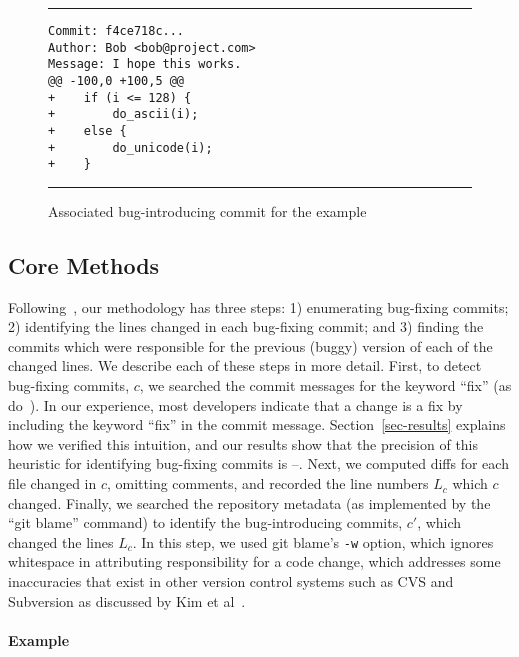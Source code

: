 \begin{figure}[t!bh]
\centering
\rule{0.92\columnwidth}{0.5pt}
\begin{minipage}[h]{0.92\columnwidth}
\begin{lstlisting}[basicstyle=\small]
Commit: f4ce718c...
Author: Bob <bob@project.com>
Message: I hope this works.
@@ -100,0 +100,5 @@
+    if (i <= 128) {
+        do_ascii(i);
+    else {
+        do_unicode(i);
+    }
\end{lstlisting}
\end{minipage}
\rule{0.92\columnwidth}{0.5pt}
\caption{\label{fig-introduction}Associated bug-introducing commit for the example}
\end{figure}

\subsection{Core Methods}

Following~\cite{sliwerski-msr-2005}, our methodology has three steps: 1)
enumerating bug-fixing commits; 2) identifying the lines changed in each
bug-fixing commit; and 3) finding the commits which were responsible for the
previous (buggy) version of each of the changed lines. We describe each of these
steps in more detail. First, to detect bug-fixing commits, $c$, we searched the
commit messages for the keyword ``fix'' (as do~\cite{smallCommits05}). In our
experience, most developers indicate that a change is a fix by including the
keyword ``fix'' in the commit message. Section~\ref{sec-results} explains how we
verified this intuition, and our results show that the precision of this
heuristic for identifying bug-fixing commits is \postP--\linuxP. Next, we
computed diffs for each file changed in $c$, omitting comments, and recorded the
line numbers $L_c$ which $c$ changed. Finally, we searched the repository
metadata (as implemented by the ``git blame'' command) to identify the
bug-introducing commits, $c'$, which changed the lines $L_c$. In this step, we
used git blame's {\tt -w} option, which ignores whitespace in attributing
responsibility for a code change, which addresses some inaccuracies that exist
in other version control systems such as CVS and Subversion as discussed by Kim
et al~\cite{2006-automatic}.

\paragraph{Example}

